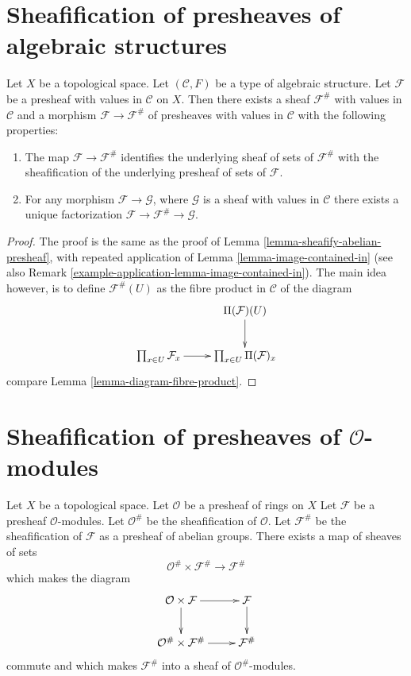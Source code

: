 \section{Sheafification of presheaves of algebraic structures}
\label{section-sheafification-presheaves-structures}


\begin{lemma}
\label{lemma-sheafify-presheaf-structures}
Let $X$ be a topological space.
Let $(\mathcal{C}, F)$ be a type of algebraic structure.
Let $\mathcal{F}$ be a presheaf with values in $\mathcal{C}$
on $X$. Then there exists a sheaf $\mathcal{F}^\#$ with values
in $\mathcal{C}$ and a morphism $\mathcal{F} \to \mathcal{F}^\#$
of presheaves with values in $\mathcal{C}$ with the
following properties:
\begin{enumerate}
\item The map $\mathcal{F} \to \mathcal{F}^\#$ identifies
the underlying sheaf of sets of $\mathcal{F}^\#$ with
the sheafification of the underlying presheaf of sets of $\mathcal{F}$.
\item For any morphism $\mathcal{F} \to \mathcal{G}$, where
$\mathcal{G}$ is a sheaf with values in $\mathcal{C}$ there exists
a unique factorization $\mathcal{F} \to \mathcal{F}^\# \to \mathcal{G}$.
\end{enumerate}
\end{lemma}

\begin{proof}
The proof is the same as the proof of
Lemma \ref{lemma-sheafify-abelian-presheaf},
with repeated application of
Lemma \ref{lemma-image-contained-in} (see also
Remark \ref{example-application-lemma-image-contained-in}).
The main idea however, is to define $\mathcal{F}^\#(U)$
as the fibre product in $\mathcal{C}$ of the diagram
$$
\xymatrix{
 &
\Pi(\mathcal{F})(U) \ar[d] \\
\prod_{x \in U} \mathcal{F}_x
\ar[r] &
\prod_{x \in U} \Pi(\mathcal{F})_x
}
$$
compare Lemma \ref{lemma-diagram-fibre-product}.
\end{proof}

\section{Sheafification of presheaves of $\mathcal{O}$-modules}
\label{section-sheafification-presheaves-modules}

\begin{lemma}
\label{lemma-sheafification-presheaf-modules}
Let $X$ be a topological space.
Let $\mathcal{O}$ be a presheaf of rings on $X$
Let $\mathcal{F}$ be a presheaf $\mathcal{O}$-modules.
Let $\mathcal{O}^\#$ be the sheafification of $\mathcal{O}$.
Let $\mathcal{F}^\#$ be the sheafification of $\mathcal{F}$
as a presheaf of abelian groups. There exists a map of
sheaves of sets
$$
\mathcal{O}^\# \times \mathcal{F}^\#
\longrightarrow
\mathcal{F}^\#
$$
which makes the diagram
$$
\xymatrix{
\mathcal{O} \times \mathcal{F} \ar[r] \ar[d] &
\mathcal{F} \ar[d] \\
\mathcal{O}^\# \times \mathcal{F}^\# \ar[r] &
\mathcal{F}^\#
}
$$
commute and which makes $\mathcal{F}^\#$ into a sheaf
of $\mathcal{O}^\#$-modules.
\end{lemma}

